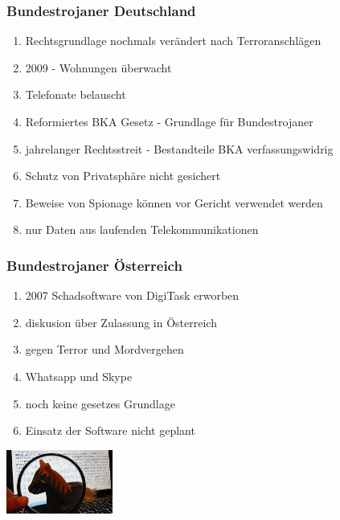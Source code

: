\documentclass{beamer}
\begin{document}
\begin{frame}
	\frametitle{Bundestrojaner Deutschland}
	\begin{enumerate}
		\item Rechtsgrundlage nochmals verändert nach Terroranschlägen
		\item 2009 - Wohnungen überwacht
		\item Telefonate belauscht
		\item Reformiertes BKA Gesetz - Grundlage für Bundestrojaner
		\item jahrelanger Rechtsstreit - Bestandteile BKA verfassungswidrig 
		\item Schutz von Privatsphäre nicht gesichert
		\item Beweise von Spionage können vor Gericht verwendet werden
		\item nur Daten aus laufenden Telekommunikationen 
	\end{enumerate}
\end{frame}


\begin{frame}
	\frametitle{Bundestrojaner Österreich}
		\begin{enumerate}
		\item 2007 Schadsoftware von DigiTask erworben
		\item diskusion über Zulassung in Österreich
		\item gegen Terror und Mordvergehen
		\item Whatsapp und Skype 
		\item noch keine gesetzes Grundlage 
		\item Einsatz der Software nicht geplant
		\end{enumerate}
		\flushright
	\includegraphics[width= 3.5cm]{bilder/oesterreich.jpg}
\end{frame}
\end{document}
